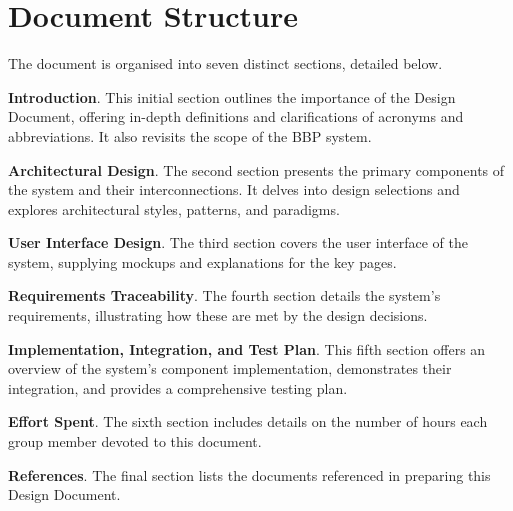 \newpage

\section{Document Structure}
\label{sec:doc_structure}%
The document is organised into seven distinct sections, detailed below.

\textbf{Introduction}. This initial section outlines the importance of the Design 
Document, offering in-depth definitions and clarifications of acronyms and abbreviations. It also revisits the scope of the BBP system.

\textbf{Architectural Design}. The second section presents the primary components of the system and their interconnections. It delves into design selections and explores architectural styles, patterns, and paradigms.

\textbf{User Interface Design}. The third section covers the user interface of the system, supplying mockups and explanations for the key pages.

\textbf{Requirements Traceability}. The fourth section details the system's requirements, illustrating how these are met by the design decisions.

\textbf{Implementation, Integration, and Test Plan}. This fifth section offers an overview of the system's component implementation, demonstrates their integration, and provides a comprehensive testing plan.

\textbf{Effort Spent}. The sixth section includes details on the number of hours each group member devoted to this document.

\textbf{References}. The final section lists the documents referenced in preparing this Design Document.